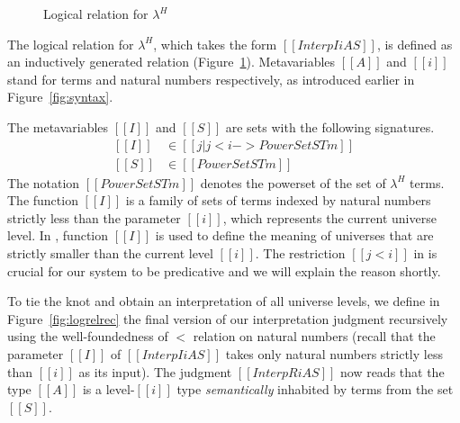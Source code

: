 \documentclass[acmsmall,screen=true,
\ifpublic review=false\else,review=true\fi
  ,anonymous=\ifanonymous true\else false\fi]{acmart}
\newcommand{\lang}{$\lambda^H$\xspace}
\newcommand{\scw}[1]{}
\newcommand{\yl}[1]{}
\begin{document}
\label{sec:logreldep}
\begin{figure}[h]
\caption{Logical relation for \lang}
\label{fig:logrel}
\end{figure}
The logical relation for \lang{}, which takes the form $[[Interp I i A
S]]$, is defined as an inductively generated relation (Figure~\ref{fig:logrel}).
Metavariables $[[A]]$ and $[[i]]$ stand for terms and natural
numbers respectively, as introduced earlier in
Figure~\ref{fig:syntax}.
\scw{Is it worth observing here that this definition is not over sets of typed
terms. That it characterizes all terms that look like booleans (i.e. evaluate to
true or false) or all terms that look like proofs (i.e. evaluate to refl). The
fact that there is no connection between p and a and b in the I-Eq case is strange
looking. Need to explain.  }
The metavariables $[[I]]$ and $[[S]]$ are
sets with the following signatures.
\begin{equation*}
  \begin{split}
    [[I]] &\in [[ { j | j < i  } ->  PowerSet STm ]] \\
    [[S]] &\in [[PowerSet STm]]
  \end{split}
\end{equation*}
The notation $[[PowerSet STm]]$ denotes the powerset of the set of
\lang{} terms.
The function $[[I]]$ is a family of sets of terms indexed by
natural numbers strictly less than the parameter $[[i]]$, which
represents the current universe level.  In , function
$[[I]]$ is used to define the meaning of
universes that are strictly smaller than the current level $[[i]]$. The
restriction $[[j < i]]$ in  is crucial for our system to
be predicative and we will explain the reason shortly.

To tie the knot and obtain an interpretation of all universe levels,
we define in Figure~\ref{fig:logrelrec} the final version of our interpretation judgment recursively
using the well-foundedness of $<$ relation on natural
numbers (recall that
the parameter $[[I]]$ of $[[Interp I i A S]]$ takes only natural
numbers strictly less than $[[i]]$ as its input).
The judgment $[[InterpR i A S]]$ now reads that the type $[[A]]$ is a
level-$[[i]]$ type \emph{semantically} inhabited by terms from the set
$[[S]]$.
\end{document}
